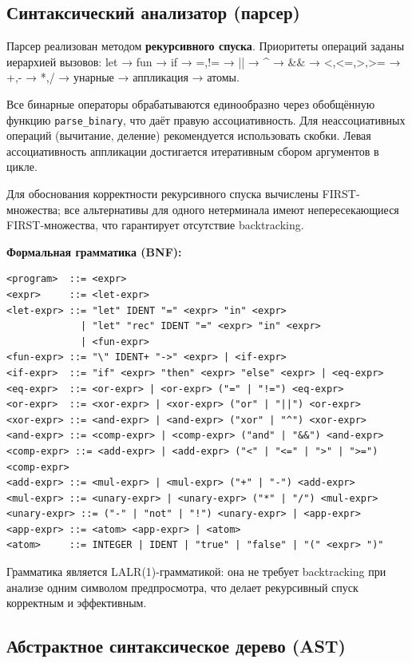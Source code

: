 \documentclass[a4paper]{article}
\begin{document}
\subsection{Синтаксический анализатор (парсер)}

Парсер реализован методом \textbf{рекурсивного спуска}. Приоритеты операций заданы иерархией вызовов: let → fun → if → =,!= → || → \^{} → \&\& → <,<=,>,>= → +,- → *,/ → унарные → аппликация → атомы.

Все бинарные операторы обрабатываются единообразно через обобщённую функцию \texttt{parse\_binary}, что даёт правую ассоциативность. Для неассоциативных операций (вычитание, деление) рекомендуется использовать скобки. Левая ассоциативность аппликации достигается итеративным сбором аргументов в цикле.

Для обоснования корректности рекурсивного спуска вычислены FIRST-множества; все альтернативы для одного нетерминала имеют непересекающиеся FIRST-множества, что гарантирует отсутствие backtracking.

\textbf{Формальная грамматика (BNF):}

\begin{verbatim}
<program>  ::= <expr>
<expr>     ::= <let-expr>
<let-expr> ::= "let" IDENT "=" <expr> "in" <expr>
             | "let" "rec" IDENT "=" <expr> "in" <expr>
             | <fun-expr>
<fun-expr> ::= "\" IDENT+ "->" <expr> | <if-expr>
<if-expr>  ::= "if" <expr> "then" <expr> "else" <expr> | <eq-expr>
<eq-expr>  ::= <or-expr> | <or-expr> ("=" | "!=") <eq-expr>
<or-expr>  ::= <xor-expr> | <xor-expr> ("or" | "||") <or-expr>
<xor-expr> ::= <and-expr> | <and-expr> ("xor" | "^") <xor-expr>
<and-expr> ::= <comp-expr> | <comp-expr> ("and" | "&&") <and-expr>
<comp-expr> ::= <add-expr> | <add-expr> ("<" | "<=" | ">" | ">=") <comp-expr>
<add-expr> ::= <mul-expr> | <mul-expr> ("+" | "-") <add-expr>
<mul-expr> ::= <unary-expr> | <unary-expr> ("*" | "/") <mul-expr>
<unary-expr> ::= ("-" | "not" | "!") <unary-expr> | <app-expr>
<app-expr> ::= <atom> <app-expr> | <atom>
<atom>     ::= INTEGER | IDENT | "true" | "false" | "(" <expr> ")"
\end{verbatim}

Грамматика является LALR(1)-грамматикой: она не требует backtracking при анализе одним символом предпросмотра, что делает рекурсивный спуск корректным и эффективным.

\subsection{Абстрактное синтаксическое дерево (AST)}
\end{document}
